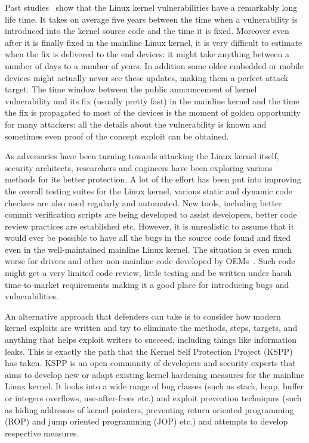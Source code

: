 Past studies~\cite{stoep2016android, cooklss2016} show that the Linux kernel vulnerabilities have a remarkably long life time. It takes on average five years between the time when a vulnerability is introduced into the kernel source code and the time it is fixed. Moreover even after it is finally fixed in the mainline Linux kernel, it is very difficult to estimate when the fix is delivered to the end devices: it might take anything between a number of days to a number of years. In addition some older embedded or mobile devices might actually never see these updates, making them a perfect attack target. The time window between the public announcement of kernel vulnerability and its fix (usually pretty fast) in the mainline kernel and the time the fix is propagated to most of the devices is the moment of golden opportunity for many attackers: all the details about the vulnerability is known and sometimes even proof of the concept exploit can be obtained.

As adversaries have been turning towards attacking the Linux kernel itself, security architects, researchers and engineers have been exploring various methods for its better protection. A lot of the effort has been put into improving the overall testing suites for the Linux kernel, various static and dynamic code checkers are also used regularly and automated. New tools, including better commit verification scripts are being developed to assist developers, better code review practices are established etc. However, it is unrealistic to assume that it would ever be possible to have all the bugs in the source code found and fixed even in the well-maintained mainline Linux kernel. The situation is even much worse for drivers and other non-mainline code developed by OEMs~\cite{stoep2016android}. Such code might get a very limited code review, little testing and be written under harsh time-to-market requirements making it a good place for introducing bugs and vulnerabilities.

An alternative approach that defenders can take is to consider how modern kernel exploits are written and try to eliminate the methods, steps, targets, and anything that helps exploit writers to succeed, including things like information leaks. This is exactly the path that the Kernel Self Protection Project (KSPP)~\cite{kspp} has taken. KSPP is an open community of developers and security experts that aims to develop new or adapt existing kernel hardening measures for the mainline Linux kernel. It looks into a wide range of bug classes (such as stack, heap, buffer or integers overflows, use-after-frees etc.) and exploit prevention techniques (such as hiding addresses of kernel pointers, preventing return oriented programming (ROP) and jump oriented programming (JOP) etc.) and attempts to develop respective measures.

